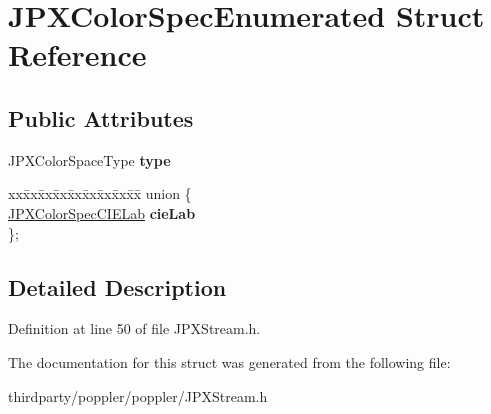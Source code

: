 \hypertarget{struct_j_p_x_color_spec_enumerated}{}\section{J\+P\+X\+Color\+Spec\+Enumerated Struct Reference}
\label{struct_j_p_x_color_spec_enumerated}
\subsection*{Public Attributes}
\begin{DoxyCompactItemize}
\item 
\mbox{\label{struct_j_p_x_color_spec_enumerated_a1a227798de4e7ac0d0f68a440c4d9a3d}} 
J\+P\+X\+Color\+Space\+Type {\bfseries type}
\item 
\mbox{\label{struct_j_p_x_color_spec_enumerated_a97205e0b1a8b1438c9841f3dab4f7d63}} 
\begin{tabbing}
xx\=xx\=xx\=xx\=xx\=xx\=xx\=xx\=xx\=\kill
union \{\\
\>\hyperlink{struct_j_p_x_color_spec_c_i_e_lab}{JPXColorSpecCIELab} {\bfseries cieLab}\\
\}; \\

\end{tabbing}\end{DoxyCompactItemize}


\subsection{Detailed Description}


Definition at line 50 of file J\+P\+X\+Stream.\+h.



The documentation for this struct was generated from the following file\+:\begin{DoxyCompactItemize}
\item 
thirdparty/poppler/poppler/J\+P\+X\+Stream.\+h\end{DoxyCompactItemize}
